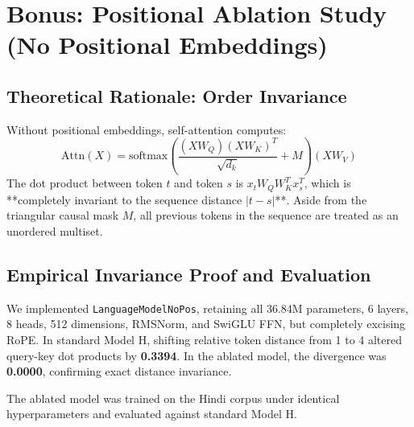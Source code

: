 \documentclass[10pt,a4paper]{article}
\begin{document}
\section{Bonus: Positional Ablation Study (No Positional Embeddings)}

\subsection{Theoretical Rationale: Order Invariance}
Without positional embeddings, self-attention computes:
\begin{equation}
\text{Attn}(X) = \text{softmax}\left( \frac{(XW_Q)(XW_K)^T}{\sqrt{d_k}} + M \right) (XW_V)
\end{equation}
The dot product between token $t$ and token $s$ is $x_t W_Q W_K^T x_s^T$, which is **completely invariant to the sequence distance $|t - s|$**. Aside from the triangular causal mask $M$, all previous tokens in the sequence are treated as an unordered multiset.

\subsection{Empirical Invariance Proof and Evaluation}
We implemented \texttt{LanguageModelNoPos}, retaining all 36.84M parameters, 6 layers, 8 heads, 512 dimensions, RMSNorm, and SwiGLU FFN, but completely excising RoPE. In standard Model H, shifting relative token distance from 1 to 4 altered query-key dot products by \textbf{0.3394}. In the ablated model, the divergence was \textbf{0.0000}, confirming exact distance invariance.

The ablated model was trained on the Hindi corpus under identical hyperparameters and evaluated against standard Model H.
\end{document}
